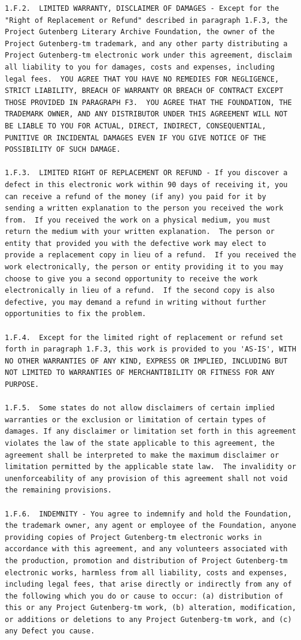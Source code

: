 \documentclass{book}[2004/02/16]
\begin{document}
\begin{verbatim}
1.F.2.  LIMITED WARRANTY, DISCLAIMER OF DAMAGES - Except for the
"Right of Replacement or Refund" described in paragraph 1.F.3, the
Project Gutenberg Literary Archive Foundation, the owner of the
Project Gutenberg-tm trademark, and any other party distributing a
Project Gutenberg-tm electronic work under this agreement, disclaim
all liability to you for damages, costs and expenses, including
legal fees.  YOU AGREE THAT YOU HAVE NO REMEDIES FOR NEGLIGENCE,
STRICT LIABILITY, BREACH OF WARRANTY OR BREACH OF CONTRACT EXCEPT
THOSE PROVIDED IN PARAGRAPH F3.  YOU AGREE THAT THE FOUNDATION, THE
TRADEMARK OWNER, AND ANY DISTRIBUTOR UNDER THIS AGREEMENT WILL NOT
BE LIABLE TO YOU FOR ACTUAL, DIRECT, INDIRECT, CONSEQUENTIAL,
PUNITIVE OR INCIDENTAL DAMAGES EVEN IF YOU GIVE NOTICE OF THE
POSSIBILITY OF SUCH DAMAGE.

1.F.3.  LIMITED RIGHT OF REPLACEMENT OR REFUND - If you discover a
defect in this electronic work within 90 days of receiving it, you
can receive a refund of the money (if any) you paid for it by
sending a written explanation to the person you received the work
from.  If you received the work on a physical medium, you must
return the medium with your written explanation.  The person or
entity that provided you with the defective work may elect to
provide a replacement copy in lieu of a refund.  If you received the
work electronically, the person or entity providing it to you may
choose to give you a second opportunity to receive the work
electronically in lieu of a refund.  If the second copy is also
defective, you may demand a refund in writing without further
opportunities to fix the problem.

1.F.4.  Except for the limited right of replacement or refund set
forth in paragraph 1.F.3, this work is provided to you 'AS-IS', WITH
NO OTHER WARRANTIES OF ANY KIND, EXPRESS OR IMPLIED, INCLUDING BUT
NOT LIMITED TO WARRANTIES OF MERCHANTIBILITY OR FITNESS FOR ANY
PURPOSE.

1.F.5.  Some states do not allow disclaimers of certain implied
warranties or the exclusion or limitation of certain types of
damages. If any disclaimer or limitation set forth in this agreement
violates the law of the state applicable to this agreement, the
agreement shall be interpreted to make the maximum disclaimer or
limitation permitted by the applicable state law.  The invalidity or
unenforceability of any provision of this agreement shall not void
the remaining provisions.

1.F.6.  INDEMNITY - You agree to indemnify and hold the Foundation,
the trademark owner, any agent or employee of the Foundation, anyone
providing copies of Project Gutenberg-tm electronic works in
accordance with this agreement, and any volunteers associated with
the production, promotion and distribution of Project Gutenberg-tm
electronic works, harmless from all liability, costs and expenses,
including legal fees, that arise directly or indirectly from any of
the following which you do or cause to occur: (a) distribution of
this or any Project Gutenberg-tm work, (b) alteration, modification,
or additions or deletions to any Project Gutenberg-tm work, and (c)
any Defect you cause.



\end{verbatim}
\end{document}
